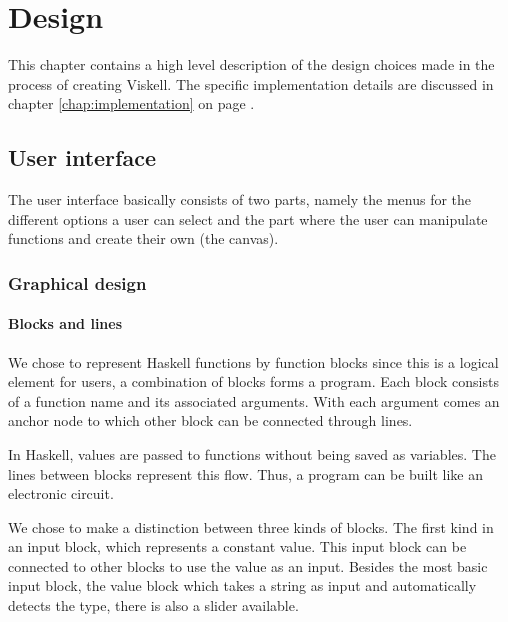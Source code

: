 \chapter{Design}

This chapter contains a high level description of the design choices made in the process of creating Viskell.
The specific implementation details are discussed in chapter \ref{chap:implementation} on page \pageref{chap:implementation}.

\section{User interface}

The user interface basically consists of two parts, namely the menus for the different options a user can select and the part where the user can manipulate functions and create their own (the \gls{canvas}). 

\subsection{Graphical design}

\subsubsection{Blocks and lines}

We chose to represent Haskell functions by function blocks since this is a logical element for users, a combination of blocks forms a program.
Each block consists of a function name and its associated arguments. With each argument comes an anchor node to which other block can be connected through lines.

In Haskell, values are passed to functions without being saved as variables.
The lines between blocks represent this flow.
Thus, a program can be built like an electronic circuit.

We chose to make a distinction between three kinds of blocks.
The first kind in an input block, which represents a constant value.  
This input block can be connected to other blocks to use the value as an input.
Besides the most basic input block, the value block which takes a string as input and automatically detects the type, there is also a slider available. 

